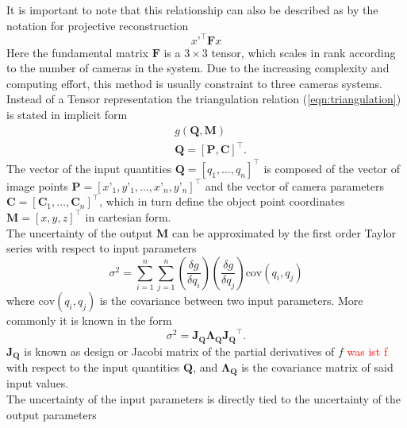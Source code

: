 \documentclass[5p,times,procedia]{elsarticle}
\begin{document}
It is important to note that this relationship can also be described as by the notation for projective reconstruction \cite{Hartley2018}
\begin{equation}
	\label{eqn:ProjectiveReconstruction}
	x’^{\top}\mathbf{F}x
\end{equation}
Here the fundamental matrix $\mathbf{F}$ is a $3\times 3$ tensor, which scales in rank according to the number of cameras in the system. Due to the increasing complexity and computing effort, this method is usually constraint to three cameras systems.\\
Instead of a Tensor representation the triangulation relation (\ref{eqn:triangulation}) is stated in implicit form
\begin{equation}
	\label{eqn:ImplicitFrom}
	\begin{aligned}
		& g(\mathbf{Q},\mathbf{M}) \\
		& \mathbf{Q} = [\mathbf{P},\mathbf{C}]^{\top}.
	\end{aligned}
\end{equation}
The vector of the input quantities $\mathbf{Q} = \left[q_1,\dots, q_{n}\right]^{\top}$ is composed of the vector of image points $\mathbf{P} = [x’_1,y’_1, \dots ,x’_n,y’_n]^{\top}$ and the vector of camera parameters $\mathbf{C} = \left[ \mathbf{C}_1 , \dots , \mathbf{C}_n \right]^{\top}$, which in turn define the object point coordinates $\mathbf{M} =  [x,y,z]^{\top}$ in cartesian form. \\
The uncertainty of the output $\mathbf{M}$ can be approximated by the first order Taylor series with respect to input parameters
\begin{equation}
	\sigma^2 = \sum_{i=1}^{n}\sum_{j=1}^{n} \left(\frac{\delta g}{\delta q_i}\right) \left(\frac{\delta g}{\delta q_j}\right) \mathrm{cov}(q_i, q_j) 
\end{equation}
where $\mathrm{cov}(q_i, q_j) $ is the covariance between two input parameters. More commonly it is known in the form~\cite{Cox2006}  
\begin{equation}
	\sigma^2 = \mathbf{J_{Q}}\mathbf{\Lambda_{Q}}\mathbf{J_{Q}}^{\top}.
\end{equation}
$\mathbf{J_{Q}}$ is known as design or Jacobi matrix of the partial derivatives of $f$ \textcolor{red}{was ist f} with respect to the input quantities $\mathbf{Q}$, and $\mathbf{\Lambda_Q}$ is the covariance matrix of said input values. \\
The uncertainty of the input parameters is directly tied to the uncertainty of the output parameters
\end{document}
